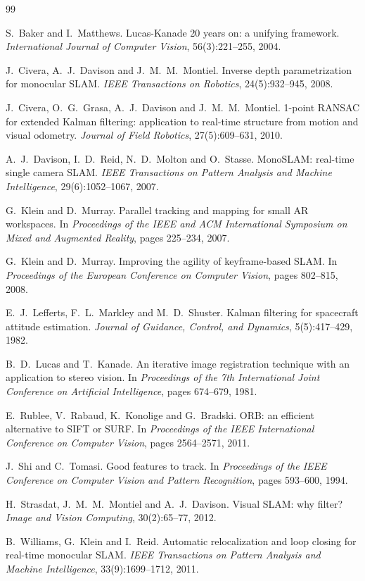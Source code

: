 \documentclass[11pt]{article}
\begin{document}
\begin{thebibliography}{99}

S.~Baker and I.~Matthews.
Lucas-Kanade 20 years on: a unifying framework.
\emph{International Journal of Computer Vision}, 56(3):221--255, 2004.

J.~Civera, A.~J.~Davison and J.~M.~M.~Montiel.
Inverse depth parametrization for monocular SLAM.
\emph{IEEE Transactions on Robotics}, 24(5):932--945, 2008.

J.~Civera, O.~G.~Grasa, A.~J.~Davison and J.~M.~M.~Montiel.
1-point RANSAC for extended Kalman filtering: application to real-time structure from motion and
visual odometry.
\emph{Journal of Field Robotics}, 27(5):609--631, 2010.

A.~J.~Davison, I.~D.~Reid, N.~D.~Molton and O.~Stasse.
MonoSLAM: real-time single camera SLAM.
\emph{IEEE Transactions on Pattern Analysis and Machine Intelligence}, 29(6):1052--1067, 2007.

G.~Klein and D.~Murray.
Parallel tracking and mapping for small AR workspaces.
In \emph{Proceedings of the IEEE and ACM International Symposium on Mixed and Augmented Reality},
pages 225--234, 2007.

G.~Klein and D.~Murray.
Improving the agility of keyframe-based SLAM.
In \emph{Proceedings of the European Conference on Computer Vision}, pages 802--815, 2008.

E.~J.~Lefferts, F.~L.~Markley and M.~D.~Shuster.
Kalman filtering for spacecraft attitude estimation.
\emph{Journal of Guidance, Control, and Dynamics}, 5(5):417--429, 1982.

B.~D.~Lucas and T.~Kanade.
An iterative image registration technique with an application to stereo vision.
In \emph{Proceedings of the 7th International Joint Conference on Artificial Intelligence}, pages
674--679, 1981.

E.~Rublee, V.~Rabaud, K.~Konolige and G.~Bradski.
ORB: an efficient alternative to SIFT or SURF.
In \emph{Proceedings of the IEEE International Conference on Computer Vision}, pages 2564--2571,
2011.

J.~Shi and C.~Tomasi.
Good features to track.
In \emph{Proceedings of the IEEE Conference on Computer Vision and Pattern Recognition}, pages
593--600, 1994.

H.~Strasdat, J.~M.~M.~Montiel and A.~J.~Davison.
Visual SLAM: why filter?
\emph{Image and Vision Computing}, 30(2):65--77, 2012.

B.~Williams, G.~Klein and I.~Reid.
Automatic relocalization and loop closing for real-time monocular SLAM.
\emph{IEEE Transactions on Pattern Analysis and Machine Intelligence}, 33(9):1699--1712, 2011.

\end{thebibliography}
\end{document}

